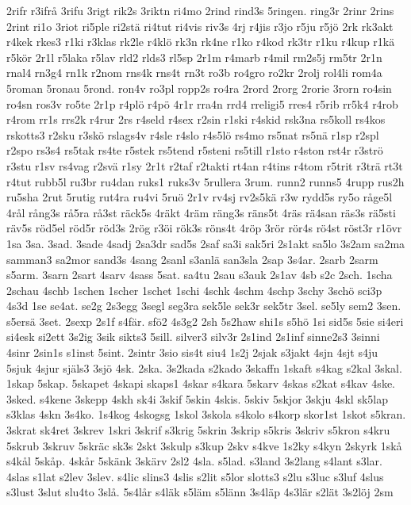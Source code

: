 {2rifr
r3ifrå
3rifu
3rigt
rik2s
3riktn
ri4mo
2rind
rind3s
5ringen.
ring3r
2rinr
2rins
2rint
ri1o
3riot
ri5ple
ri2stä
ri4tut
ri4vis
riv3s
4rj
r4jis
r3jo
r5ju
r5jö
2rk
rk3akt
r4kek
rkes3
r1ki
r3klas
rk2le
r4klö
rk3n
rk4ne
r1ko
r4kod
rk3tr
r1ku
r4kup
r1kä
r5kör
2r1l
r5laka
r5lav
rld2
rlds3
rl5sp
2r1m
r4marb
r4mil
rm2s5j
rm5tr
2r1n
rnal4
rn3g4
rn1k
r2nom
rns4k
rns4t
rn3t
ro3b
ro4gro
ro2kr
2rolj
rol4li
rom4a
5roman
5ronau
5rond.
ron4v
ro3pl
ropp2s
ro4ra
2rord
2rorg
2rorie
3rorn
ro4sin
ro4sn
ros3v
ro5te
2r1p
r4plö
r4pö
4r1r
rra4n
rrd4
rreligi5
rres4
r5rib
rr5k4
r4rob
r4rom
rr1s
rrs2k
r4rur
2rs
r4seld
r4sex
r2sin
r1ski
r4skid
rsk3na
rs5koll
rs4kos
rskotts3
r2sku
r3skö
rslags4v
r4sle
r4slo
r4s5lö
rs4mo
rs5nat
rs5nä
r1sp
r2spl
r2spo
rs3s4
rs5tak
rs4te
r5stek
rs5tend
r5steni
rs5till
r1sto
r4ston
rst4r
r3strö
r3stu
r1sv
rs4vag
r2svä
r1sy
2r1t
r2taf
r2takti
rt4an
r4tins
r4tom
r5trit
r3trä
rt3t
r4tut
rubb5l
ru3br
ru4dan
ruks1
ruks3v
5rullera
3rum.
runn2
runns5
4rupp
rus2h
ru5sha
2rut
5rutig
rut4ra
ru4vi
5ruö
2r1v
rv4sj
rv2s5kä
r3w
rydd5s
ry5o
råge5l
4rål
rång3s
rå5ra
rå3st
räck5s
4räkt
4räm
räng3s
räns5t
4räs
rä4san
räs3s
rä5sti
räv5s
röd5el
röd5r
röd3s
2rög
r3öi
rök3s
röns4t
4röp
3rör
rör4s
rö4st
röst3r
r1övr
1sa
3sa.
3sad.
3sade
4sadj
2sa3dr
sad5s
2saf
sa3i
sak5ri
2s1akt
sa5lo
3s2am
sa2ma
samman3
sa2mor
sand3s
4sang
2sanl
s3anlä
san3sla
2sap
3s4ar.
2sarb
2sarm
s5arm.
3sarn
2sart
4sarv
4sass
5sat.
sa4tu
2sau
s3auk
2s1av
4sb
s2c
2sch.
1scha
2schau
4schb
1schen
1scher
1schet
1schi
4schk
4schm
4schp
3schy
3schö
sci3p
4s3d
1se
se4at.
se2g
2s3egg
3segl
seg3ra
sek5le
sek3r
sek5tr
3sel.
se5ly
sem2
3sen.
s5ersä
3set.
2sexp
2s1f
s4fär.
sfö2
4s3g2
2sh
5s2haw
shi1s
s5hö
1si
sid5s
5sie
si4eri
si4esk
si2ett
3s2ig
3sik
sikts3
5sill.
silver3
silv3r
2s1ind
2s1inf
sinne2s3
3sinni
4sinr
2sin1s
s1inst
5sint.
2sintr
3sio
sis4t
siu4
1s2j
2sjak
s3jakt
4sjn
4sjt
s4ju
5sjuk
4sjur
själs3
3sjö
4sk.
2ska.
3s2kada
s2kado
3skaffn
1skaft
s4kag
s2kal
3skal.
1skap
5skap.
5skapet
4skapi
skaps1
4skar
s4kara
5skarv
4skas
s2kat
s4kav
4ske.
3sked.
s4kene
3skepp
4skh
sk4i
3skif
5skin
4skis.
5skiv
5skjor
3skju
4skl
sk5lap
s3klas
4skn
3s4ko.
1s4kog
4skogsg
1skol
3skola
s4kolo
s4korp
skor1st
1skot
s5kran.
3skrat
sk4ret
3skrev
1skri
3skrif
s3krig
5skrin
3skrip
s5kris
3skriv
s5kron
s4kru
5skrub
3skruv
5skräc
sk3s
2skt
3skulp
s3kup
2skv
s4kve
1s2ky
s4kyn
2skyrk
1skå
s4kål
5skåp.
4skår
5skänk
3skärv
2sl2
4sla.
s5lad.
s3land
3s2lang
s4lant
s3lar.
4slas
s1lat
s2lev
3slev.
s4lic
slins3
4slis
s2lit
s5lor
slotts3
s2lu
s3luc
s3luf
4slus
s3lust
3slut
slu4to
3slå.
5s4lår
s4läk
s5läm
s5länn
3s4läp
4s3lär
s2lät
3s2löj
2sm
}
